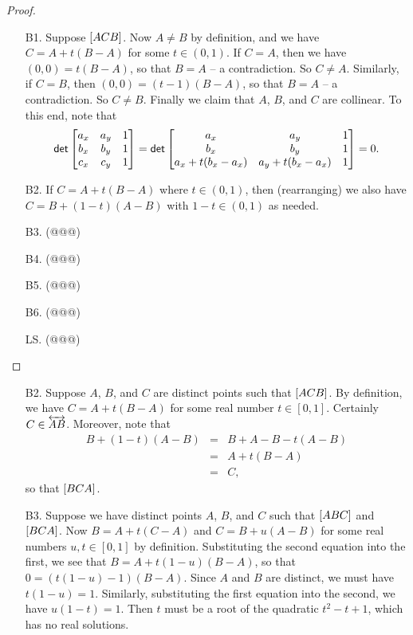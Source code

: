 \begin{proof}\mbox{}
\begin{itemize}
\item[B1.] Suppose \([ A C B ]\).
Now \(A \neq B\) by definition, and we have \(C = A + t(B-A)\) for some \(t \in (0,1)\).
If \(C = A\), then we have \((0,0) = t(B-A)\), so that \(B = A\) -- a contradiction.
So \(C \neq A\).
Similarly, if \(C = B\), then \((0,0) = (t-1)(B-A)\), so that \(B = A\) -- a contradiction.
So \(C \neq B\).
Finally we claim that \(A\), \(B\), and \(C\) are collinear.
To this end, note that \[ \mathsf{det} \begin{bmatrix} a_x & a_y & 1 \\ b_x & b_y & 1 \\ c_x & c_y & 1 \end{bmatrix} = \mathsf{det} \begin{bmatrix} a_x & a_y & 1 \\ b_x & b_y & 1 \\ a_x + t(b_x-a_x) & a_y + t(b_x-a_x) & 1 \end{bmatrix} = 0. \]

\item[B2.] If \(C = A + t(B-A)\) where \(t \in (0,1)\), then (rearranging) we also have \(C = B + (1-t)(A-B)\) with \(1-t \in (0,1)\) as needed.

\item[B3.] (@@@)

\item[B4.] (@@@)

\item[B5.] (@@@)

\item[B6.] (@@@)

\item[LS.] (@@@)
\end{itemize}
\end{proof}

\begin{itemize}
\item[B2.] Suppose \(A\), \(B\), and \(C\) are distinct points such that \([ A C B ]\).
By definition, we have \(C = A + t(B-A)\) for some real number \(t \in [0,1]\).
Certainly \(C \in \overleftrightarrow{AB}\).
Moreover, note that
\begin{eqnarray*}
B + (1-t)(A-B) & = & B + A - B - t(A-B) \\
 & = & A + t(B-A) \\
 & = & C,
\end{eqnarray*}
so that \([ B C A ]\).
\item[B3.] Suppose we have distinct points \(A\), \(B\), and \(C\) such that \([ A B C ]\) and \([ B C A ]\).
Now \(B = A + t(C-A)\) and \(C = B + u(A-B)\) for some real numbers \(u,t \in [0,1]\) by definition.
Substituting the second equation into the first, we see that \(B = A + t(1-u)(B - A)\), so that \(0 = (t(1-u) - 1)(B - A)\).
Since \(A\) and \(B\) are distinct, we must have \(t(1-u) = 1\).
Similarly, substituting the first equation into the second, we have \(u(1-t) = 1\).
Then \(t\) must be a root of the quadratic \(t^2 - t + 1\), which has no real solutions.
\end{itemize}

